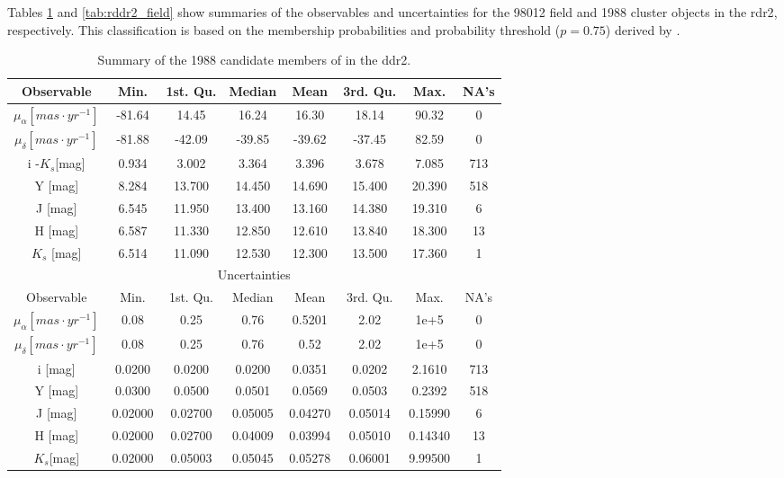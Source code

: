 Tables \ref{tab:rddr2_cluster} and \ref{tab:rddr2_field} show summaries of the observables and uncertainties for the 98012 field and 1988 cluster objects in the \gls{rdr2}, respectively. This classification is based on the membership probabilities and probability threshold ($p=0.75$) derived by \citet{Bouy2015}.

\begin{table}[ht!]
\caption{Summary of the 1988 candidate members of \citet{Bouy2015} in the \gls{ddr2}.}
\begin{center}
\begin{tabular}{|c|c|c|c|c|c|c|c|}
\hline
Observable & Min. & 1st. Qu. & Median & Mean & 3rd. Qu. & Max. & NA's \\
\hline
\hline
$\mu_{\alpha} [mas\cdot yr^{-1}]$&-81.64 &  14.45  & 16.24 &  16.30  & 18.14  & 90.32&0\\
$\mu_{\delta} [mas\cdot yr^{-1}]$&-81.88&  -42.09 & -39.85  & -39.62  &-37.45  & 82.59&0\\
i -$K_s$[mag] &  0.934 &   3.002 &  3.364  & 3.396 &  3.678 &  7.085  &   713\\
Y [mag]& 8.284 & 13.700 & 14.450  &14.690  &15.400 & 20.390  &   518\\
J [mag]& 6.545 & 11.950 & 13.400  &13.160 & 14.380  &19.310   &    6\\
H [mag]& 6.587 & 11.330 & 12.850  &12.610&  13.840 & 18.300   &   13\\
$K_s$ [mag]& 6.514 & 11.090 & 12.530 & 12.300 & 13.500 & 17.360   &    1\\
\hline
\multicolumn{8}{c}{Uncertainties}\\
\hline
Observable & Min. & 1st. Qu. & Median &Mean& 3rd. Qu. & Max. & NA's \\
\hline
\hline
$\mu_{\alpha} [mas\cdot yr^{-1}]$&0.08&0.25&0.76&0.5201&2.02&1e+5 &0\\ 
$\mu_{\delta} [mas\cdot yr^{-1}]$&0.08&0.25&0.76&0.52&2.02&1e+5& 0\\ 
i [mag] & 0.0200 & 0.0200 & 0.0200 & 0.0351 & 0.0202 & 2.1610&713 \\
Y [mag] & 0.0300&  0.0500&  0.0501&  0.0569&  0.0503 & 0.2392&518\\
J [mag] & 0.02000& 0.02700& 0.05005 &0.04270& 0.05014 &0.15990&6\\
H [mag] & 0.02000 &0.02700& 0.04009 &0.03994 &0.05010 & 0.14340&13\\
$K_s$[mag]&0.02000& 0.05003& 0.05045& 0.05278 &0.06001 &9.99500&1\\
\hline
\end{tabular}
\end{center}
\label{tab:rddr2_cluster}
\end{table}%

